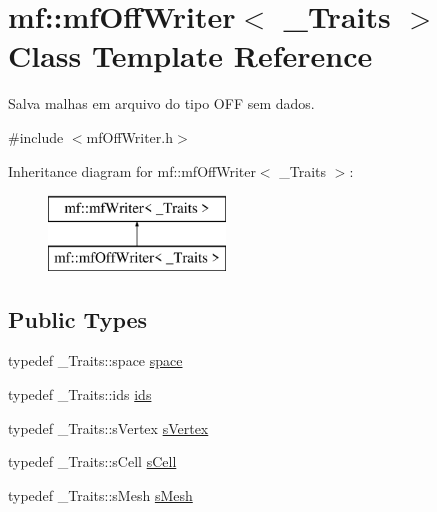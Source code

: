 \hypertarget{classmf_1_1mfOffWriter}{
\section{mf::mfOffWriter$<$ \_\-Traits $>$ Class Template Reference}
\label{classmf_1_1mfOffWriter}
}


Salva malhas em arquivo do tipo OFF sem dados.  




{\ttfamily \#include $<$mfOffWriter.h$>$}

Inheritance diagram for mf::mfOffWriter$<$ \_\-Traits $>$:\begin{figure}[H]
\begin{center}
\leavevmode
\includegraphics[height=2.000000cm]{classmf_1_1mfOffWriter}
\end{center}
\end{figure}
\subsection*{Public Types}
\begin{DoxyCompactItemize}
\item 
typedef \_\-Traits::space \hyperlink{classmf_1_1mfOffWriter_a4d6664b3f8150c35af57aed9a237c9ab}{space}
\item 
typedef \_\-Traits::ids \hyperlink{classmf_1_1mfOffWriter_ab4a116099ef81a112f35ab9d7d74a998}{ids}
\item 
typedef \_\-Traits::sVertex \hyperlink{classmf_1_1mfOffWriter_a104afc778e21da1edcad11aac363f23e}{sVertex}
\item 
typedef \_\-Traits::sCell \hyperlink{classmf_1_1mfOffWriter_a310a1b7e2284f9d36c931bf47695b980}{sCell}
\item 
typedef \_\-Traits::sMesh \hyperlink{classmf_1_1mfOffWriter_a5dee9306e438bf1819fb9823f6123b5c}{sMesh}
\end{DoxyCompactItemize}

